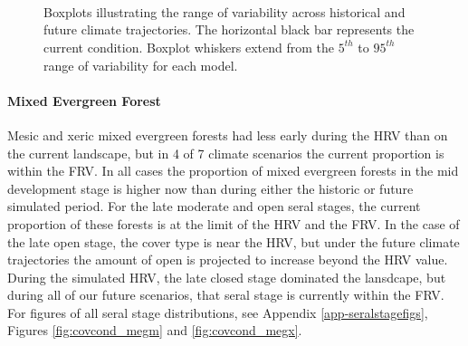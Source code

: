 \begin{figure}[htbp]
  \centering
  \qquad
   \\
  \qquad
   \\
    \\
  \qquad
    \qquad
    \caption{Boxplots illustrating the range of variability across historical and future climate trajectories. The horizontal black bar represents the current condition. Boxplot whiskers extend from the $5^{th}$ to $95^{th}$ range of variability for each model. }
  \label{fig:covcond_rfrx}
\end{figure} %

\paragraph{Mixed Evergreen Forest} Mesic and xeric mixed evergreen forests had less early during the HRV than on the current landscape, but in 4 of 7 climate scenarios the current proportion is within the FRV. In all cases the proportion of mixed evergreen forests in the mid development stage is higher now than during either the historic or future simulated period. For the late moderate and open seral stages, the current proportion of these forests is at the limit of the HRV and the FRV. In the case of the late open stage, the cover type is near the HRV, but under the future climate trajectories the amount of open is projected to increase beyond the HRV value. During the simulated HRV, the late closed stage dominated the lansdcape, but during all of our future scenarios, that seral stage is currently within the FRV. For figures of all seral stage distributions, see Appendix \ref{app-seralstagefigs}, Figures \ref{fig:covcond_megm} and \ref{fig:covcond_megx}.

